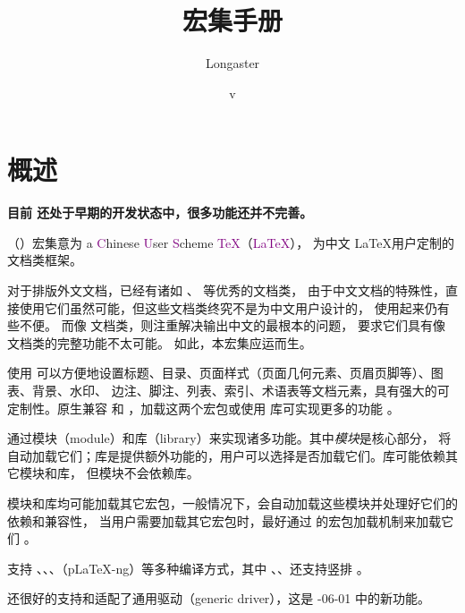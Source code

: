\documentclass{cusdoc}
\title{\CusTeX 宏集手册}
\author{Longaster}
\date{\zhtoday\quad v\UseName{cus@versi@n}}
\begin{document}
\setlength{\lineskiplimit}{4pt}
\setlength{\lineskip}{4pt}

\def\thepage{t.\arabic{page}}
\maketitle

\frontmatter
\cusdoctoc

\mainmatter
{}
\removebackground[./watermark]


\chapter{概述}

{\color{red}\bfseries 目前 \CusTeX 还处于早期的开发状态中，很多功能还并不完善。}

\CusTeX （\CusLaTeX）宏集意为 a \textcolor{purple}Chinese \textcolor{purple}User
\textcolor{purple}Scheme \textcolor{purple}\TeX（\textcolor{purple}{\LaTeX}），
为中文 \LaTeX 用户定制的文档类框架。

对于排版外文文档，已经有诸如 、 等优秀的文档类，
由于中文文档的特殊性，直接使用它们虽然可能，但这些文档类终究不是为中文用户设计的，
使用起来仍有些不便。
而像  文档类，则注重解决输出中文的最根本的问题，
要求它们具有像  文档类的完整功能不太可能。
如此，本宏集应运而生。

使用 \CusTeX 可以方便地设置标题、目录、页面样式（页面几何元素、页眉页脚等）、图表、背景、水印、
边注、脚注、列表、索引、术语表等文档元素，具有强大的可定制性。\CusTeX 原生兼容  和 
，加载这两个宏包或使用  库可实现更多的功能 \TODO。

\CusTeX 通过模块（module）和库（library）来实现诸多功能。其中\emph{模块}是核心部分，
\CusTeX 将自动加载它们；库是提供额外功能的，用户可以选择是否加载它们。库可能依赖其它模块和库，
但模块不会依赖库。

模块和库均可能加载其它宏包，一般情况下，\CusTeX 会自动加载这些模块并处理好它们的依赖和兼容性，
当用户需要加载其它宏包时，最好通过 \CusTeX 的宏包加载机制来加载它们 \TODO。

\CusTeX 支持 \XeLaTeX、\LuaLaTeX、\upLaTeX、\ApLaTeX（p\LaTeX-ng）等多种编译方式，其中
\LuaLaTeX、\upLaTeX、\ApLaTeX 还支持竖排 \TODO。

\CusTeX 还很好的支持和适配了通用驱动（generic driver），这是 -06-01 中的新功能。
\end{document}
